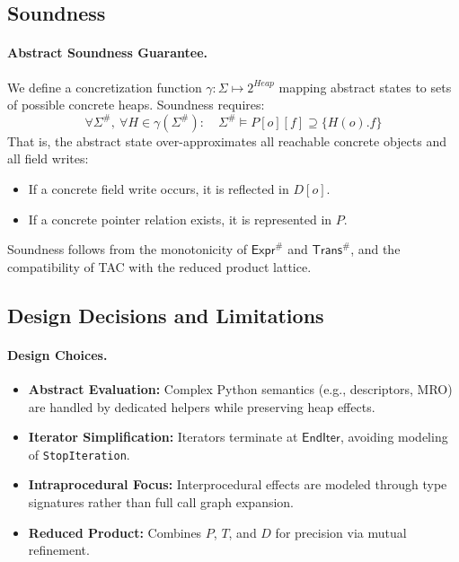 \subsection{Soundness}

\paragraph{Abstract Soundness Guarantee.}
We define a concretization function \(\gamma: \Sigma \mapsto 2^{\mathit{Heap}}\) mapping abstract states to sets of possible concrete heaps.  
Soundness requires:
\[
\forall \Sigma^\#,\ \forall H \in \gamma(\Sigma^\#):
    \quad \Sigma^\# \models P[o][f] \supseteq \{ H(o).f \}
\]
That is, the abstract state over-approximates all reachable concrete objects and all field writes:
\begin{itemize}
    \item If a concrete field write occurs, it is reflected in \(D[o]\).
    \item If a concrete pointer relation exists, it is represented in \(P\).
\end{itemize}
Soundness follows from the monotonicity of \(\mathsf{Expr}^\#\) and \(\mathsf{Trans}^\#\), and the compatibility of TAC with the reduced product lattice.

\subsection{Design Decisions and Limitations}

\paragraph{Design Choices.}
\begin{itemize}
    \item \textbf{Abstract Evaluation:} Complex Python semantics (e.g., descriptors, MRO) are handled by dedicated helpers while preserving heap effects.
    \item \textbf{Iterator Simplification:} Iterators terminate at \(\mathsf{EndIter}\), avoiding modeling of \texttt{StopIteration}.
    \item \textbf{Intraprocedural Focus:} Interprocedural effects are modeled through type signatures rather than full call graph expansion.
    \item \textbf{Reduced Product:} Combines \(P\), \(T\), and \(D\) for precision via mutual refinement.
\end{itemize}

